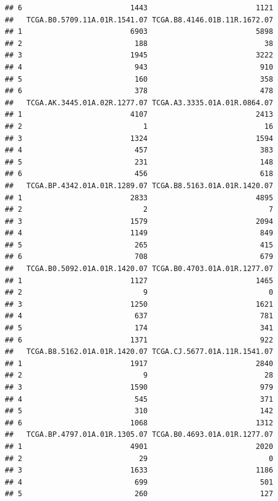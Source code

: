 \documentclass[
]{article}
\begin{document}
\begin{verbatim}
## 6                         1443                         1121
##   TCGA.B0.5709.11A.01R.1541.07 TCGA.B8.4146.01B.11R.1672.07
## 1                         6903                         5898
## 2                          188                           38
## 3                         1945                         3222
## 4                          943                          910
## 5                          160                          358
## 6                          378                          478
##   TCGA.AK.3445.01A.02R.1277.07 TCGA.A3.3335.01A.01R.0864.07
## 1                         4107                         2413
## 2                            1                           16
## 3                         1324                         1594
## 4                          457                          383
## 5                          231                          148
## 6                          456                          618
##   TCGA.BP.4342.01A.01R.1289.07 TCGA.B8.5163.01A.01R.1420.07
## 1                         2833                         4895
## 2                            2                            7
## 3                         1579                         2094
## 4                         1149                          849
## 5                          265                          415
## 6                          708                          679
##   TCGA.B0.5092.01A.01R.1420.07 TCGA.B0.4703.01A.01R.1277.07
## 1                         1127                         1465
## 2                            9                            0
## 3                         1250                         1621
## 4                          637                          781
## 5                          174                          341
## 6                         1371                          922
##   TCGA.B8.5162.01A.01R.1420.07 TCGA.CJ.5677.01A.11R.1541.07
## 1                         1917                         2840
## 2                            9                           28
## 3                         1590                          979
## 4                          545                          371
## 5                          310                          142
## 6                         1068                         1312
##   TCGA.BP.4797.01A.01R.1305.07 TCGA.B0.4693.01A.01R.1277.07
## 1                         4901                         2020
## 2                           29                            0
## 3                         1633                         1186
## 4                          699                          501
## 5                          260                          127

\end{verbatim}
\end{document}
